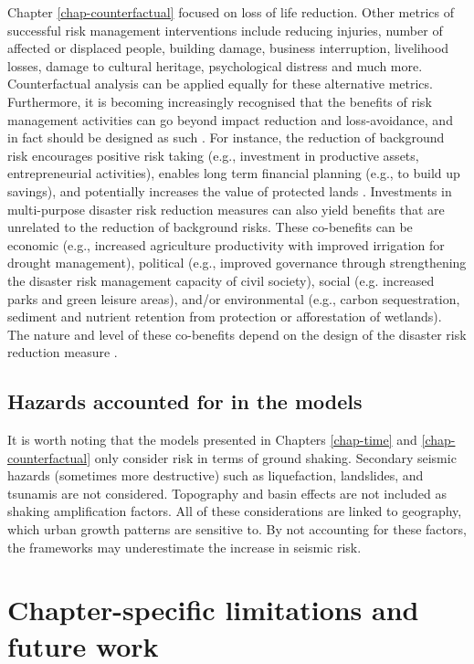     Chapter \ref{chap-counterfactual} focused on loss of life reduction. Other metrics of successful risk management interventions include reducing injuries, number of affected or displaced people, building damage, business interruption, livelihood losses, damage to cultural heritage, psychological distress and much more. Counterfactual analysis can be applied equally for these alternative metrics. Furthermore, it is becoming increasingly recognised that the benefits of risk management activities can go beyond impact reduction and loss-avoidance, and in fact should be designed as such \citep{lallemant2021nature}. For instance, the reduction of background risk encourages positive risk taking (e.g., investment in productive assets, entrepreneurial activities), enables long term financial planning (e.g., to build up savings), and potentially increases the value of protected lands \citep{Tanner2015}. Investments in multi-purpose disaster risk reduction measures can also yield benefits that are unrelated to the reduction of background risks. These co-benefits can be economic (e.g., increased agriculture productivity with improved irrigation for drought management), political (e.g., improved governance through strengthening the disaster risk management capacity of civil society), social (e.g. increased parks and green leisure areas), and/or environmental (e.g., carbon sequestration, sediment and nutrient retention from protection or afforestation of wetlands). The nature and level of these co-benefits depend on the design of the disaster risk reduction measure \citep{Tanner2015}.

\subsection{Hazards accounted for in the models} %

    It is worth noting that the models presented in Chapters \ref{chap-time} and \ref{chap-counterfactual} only consider risk in terms of ground shaking. Secondary seismic hazards (sometimes more destructive) such as liquefaction, landslides, and tsunamis are not considered. Topography and basin effects are not included as shaking amplification factors. All of these considerations are linked to geography, which urban growth patterns are sensitive to. By not accounting for these factors, the frameworks may underestimate the increase in seismic risk. %

\section{Chapter-specific limitations and future work}


